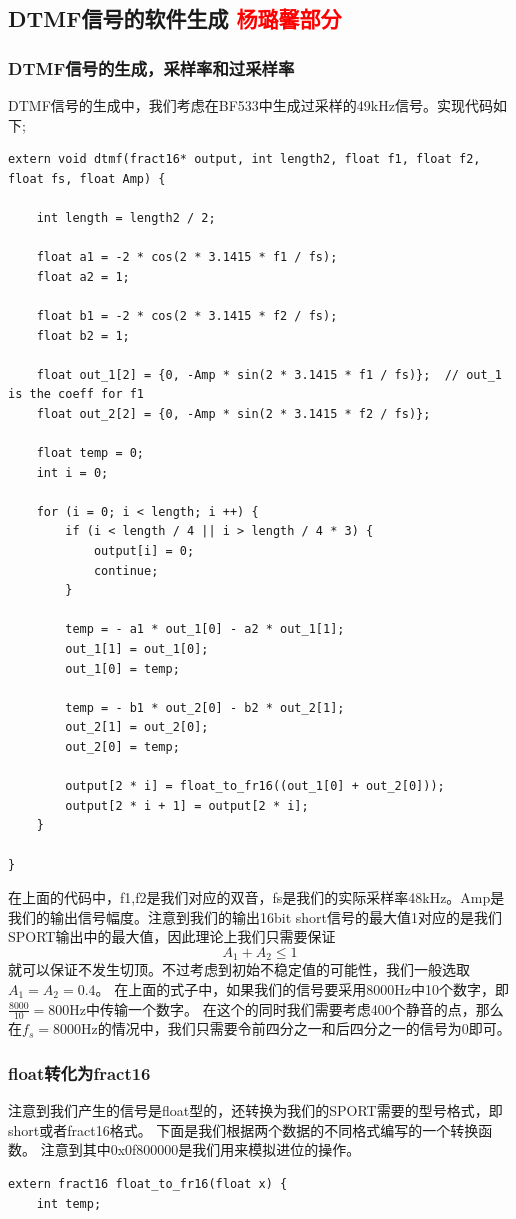 \documentclass{article}
\begin{document}
\begin{CJK}{UTF8}{gbsn}
\subsection{DTMF信号的软件生成 \textcolor{red}{杨璐馨部分}}
\subsubsection{DTMF信号的生成，采样率和过采样率}
DTMF信号的生成中，我们考虑在BF533中生成过采样的49kHz信号。实现代码如下;
\begin{lstlisting}
extern void dtmf(fract16* output, int length2, float f1, float f2, float fs, float Amp) {
	
	int length = length2 / 2;
	
	float a1 = -2 * cos(2 * 3.1415 * f1 / fs);
	float a2 = 1;

	float b1 = -2 * cos(2 * 3.1415 * f2 / fs);
	float b2 = 1;
		
	float out_1[2] = {0, -Amp * sin(2 * 3.1415 * f1 / fs)};  // out_1 is the coeff for f1
	float out_2[2] = {0, -Amp * sin(2 * 3.1415 * f2 / fs)};

	float temp = 0;
	int i = 0;

	for (i = 0; i < length; i ++) {
	    if (i < length / 4 || i > length / 4 * 3) {
			output[i] = 0;
			continue;
		}
		
		temp = - a1 * out_1[0] - a2 * out_1[1];
		out_1[1] = out_1[0];
		out_1[0] = temp;

		temp = - b1 * out_2[0] - b2 * out_2[1];
		out_2[1] = out_2[0];
		out_2[0] = temp;

		output[2 * i] = float_to_fr16((out_1[0] + out_2[0]));
		output[2 * i + 1] = output[2 * i];
	}
	
}
\end{lstlisting}
在上面的代码中，f1,f2是我们对应的双音，fs是我们的实际采样率48kHz。Amp是我们的输出信号幅度。注意到我们的输出16bit short信号的最大值1对应的是我们SPORT输出中的最大值，因此理论上我们只需要保证
\begin{equation}
A_1 + A_2 \leq 1
\end{equation}
就可以保证不发生切顶。不过考虑到初始不稳定值的可能性，我们一般选取\(A_1 = A_2 = 0.4\)。
在上面的式子中，如果我们的信号要采用8000Hz中10个数字，即\(\frac{8000}{10} = 800\)Hz中传输一个数字。
在这个的同时我们需要考虑400个静音的点，那么在\(f_s = 8000\)Hz的情况中，我们只需要令前四分之一和后四分之一的信号为0即可。
\subsubsection{float转化为fract16}
注意到我们产生的信号是float型的，还转换为我们的SPORT需要的型号格式，即short或者fract16格式。
下面是我们根据两个数据的不同格式编写的一个转换函数。
注意到其中0x0f800000是我们用来模拟进位的操作。
\begin{lstlisting}
extern fract16 float_to_fr16(float x) {
	int temp;


\end{lstlisting}
\end{CJK}
\end{document}
